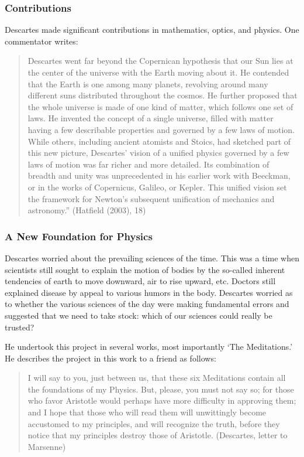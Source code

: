 \documentclass[]{article}
\begin{document}
\subsubsection{Contributions}\label{contributions}

Descartes made significant contributions in mathematics, optics, and
physics. One commentator writes:

\begin{quote}
Descartes went far beyond the Copernican hypothesis that our Sun lies at
the center of the universe with the Earth moving about it. He contended
that the Earth is one among many planets, revolving around many
different suns distributed throughout the cosmos. He further proposed
that the whole universe is made of one kind of matter, which follows one
set of laws. He invented the concept of a single universe, filled with
matter having a few describable properties and governed by a few laws of
motion. While others, including ancient atomists and Stoics, had
sketched part of this new picture, Descartes' vision of a unified
physics governed by a few laws of motion was far richer and more
detailed. Its combination of breadth and unity was unprecedented in his
earlier work with Beeckman, or in the works of Copernicus, Galileo, or
Kepler. This unified vision set the framework for Newton's subsequent
unification of mechanics and astronomy.'' (Hatfield (2003), 18)
\end{quote}

\subsubsection{A New Foundation for
Physics}\label{a-new-foundation-for-physics}

Descartes worried about the prevailing sciences of the time. This was a
time when scientists still sought to explain the motion of bodies by the
so-called inherent tendencies of earth to move downward, air to rise
upward, etc. Doctors still explained disease by appeal to various humors
in the body. Descartes worried as to whether the various sciences of the
day were making fundamental errors and suggested that we need to take
stock: which of our sciences could really be trusted?

He undertook this project in several works, most importantly `The
Meditations.' He describes the project in this work to a friend as
follows:

\begin{quote}
I will say to you, just between us, that these six Meditations contain
all the foundations of my Physics. But, please, you must not say so; for
those who favor Aristotle would perhaps have more difficulty in
approving them; and I hope that those who will read them will
unwittingly become accustomed to my principles, and will recognize the
truth, before they notice that my principles destroy those of Aristotle.
(Descartes, letter to Marsenne)
\end{quote}
\end{document}
